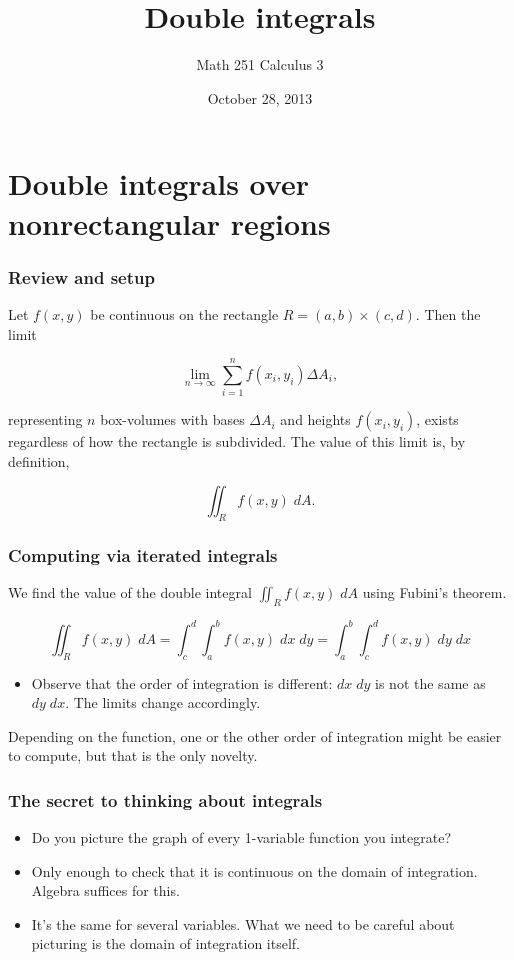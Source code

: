 \documentclass[11pt,ignorenonframetext,]{beamer}
\title{Double integrals}
\author{Math 251 Calculus 3}
\date{October 28, 2013}
\begin{document}
\frame{\titlepage}

\section{Double integrals over nonrectangular regions}

\begin{frame}\frametitle{Review and setup}

Let $f(x,y)$ be continuous on the rectangle $R = (a,b) \times (c,d)$.
Then the limit

\[ \lim_{n \to \infty} \sum_{i=1}^n f(x_i, y_i) \Delta A_i, \]

representing $n$ box-volumes with bases $\Delta A_i$ and heights
$f(x_i,y_i)$, exists regardless of how the rectangle is subdivided. The
value of this limit is, by definition,

\[ \iint_R f(x,y) \; dA. \]

\end{frame}

\begin{frame}\frametitle{Computing via iterated integrals}

We find the value of the double integral $\iint_R f(x,y) \; dA$ using
Fubini's theorem.

\[ \iint_R f(x,y) \; dA = \int_c^d \int_a^b f(x,y) \; dx \; dy = \int_a^b \int_c^d f(x,y) \; dy \; dx \]

\begin{itemize}
\itemsep1pt\parskip0pt
\item
  Observe that the order of integration is different: $dx \; dy$ is not
  the same as $dy \; dx$. The limits change accordingly.
\end{itemize}

Depending on the function, one or the other order of integration might
be easier to compute, but that is the only novelty.

\end{frame}

\begin{frame}\frametitle{The secret to thinking about integrals}

\begin{itemize}[<+->]
\itemsep1pt\parskip0pt
\item
  Do you picture the graph of every 1-variable function you integrate?
\item
  Only enough to check that it is continuous on the domain of
  integration. Algebra suffices for this.
\item
  It's the same for several variables. What we need to be careful about
  picturing is the domain of integration itself.
\end{itemize}

\end{frame}
\end{document}
